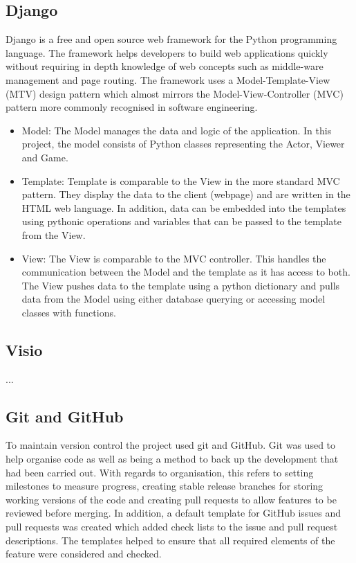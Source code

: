 \subsection{Django}
Django is a free and open source web framework for the Python programming language. The framework helps developers to build web applications quickly without requiring in depth knowledge of web concepts such as middle-ware management and page routing. The framework uses a Model-Template-View (MTV) design pattern which almost mirrors the Model-View-Controller (MVC) pattern more commonly recognised in software engineering. 
\begin{itemize}
	\item Model: The Model manages the data and logic of the application. In this project, the model consists of Python classes representing the Actor, Viewer and Game.
	
	\item Template: Template is comparable to the View in the more standard MVC pattern. They display the data to the client (webpage) and are written in the HTML web language.  In addition, data can be embedded into the templates using pythonic operations and variables that can be passed to the template from the View. 
	
	\item View: The View is comparable to the MVC controller. This handles the communication between the Model and the template as it has access to both. The View pushes data to the template using a python dictionary and pulls data from the Model using either database querying or accessing model classes with functions.
	
\end{itemize}

\subsection{Visio}
...

\subsection{Git and GitHub}
To maintain version control the project used git and GitHub. Git was used to help organise code as well as being a method to back up the development that had been carried out. With regards to organisation, this refers to setting milestones to measure progress, creating stable release branches for storing working versions of the code and creating pull requests to allow features to be reviewed before merging. In addition, a default template for GitHub issues and pull requests was created which added check lists to the issue and pull request descriptions. The templates helped to ensure that all required elements of the feature were considered and checked.

